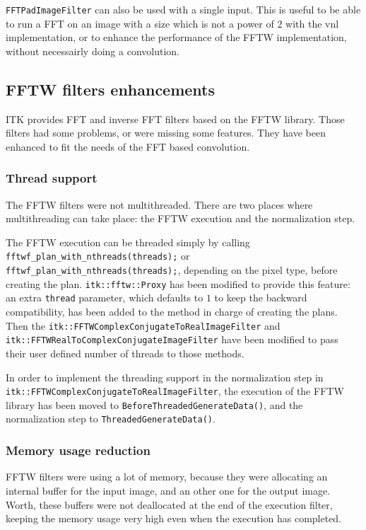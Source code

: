 \documentclass{InsightArticle}
\begin{document}
\verb$FFTPadImageFilter$ can also be used with a single input. This is useful to be able to run a FFT
on an image with a size which is not a power of 2 with the vnl implementation, or to enhance the performance
of the FFTW implementation, without necessairly doing a convolution.

\subsection{FFTW filters enhancements}

ITK provides FFT and inverse FFT filters based on the FFTW library. Those filters had some problems,
or were missing some features. They have been enhanced to fit the needs of the FFT based convolution.

\subsubsection{Thread support}
The FFTW filters were not multithreaded. There are two places where multithreading can take place: the
FFTW execution and the normalization step.

The FFTW execution can be threaded simply by calling \verb$fftwf_plan_with_nthreads(threads);$ or 
\verb$fftwf_plan_with_nthreads(threads);$, depending on the pixel type, before creating the plan. 
\verb$itk::fftw::Proxy$ has been modified to provide this feature: an extra \verb$thread$ parameter,
which defaults
to $1$ to keep the backward compatibility, has been added to the method in charge of creating the plans.
Then the \verb$itk::FFTWComplexConjugateToRealImageFilter$ and
\verb$itk::FFTWRealToComplexConjugateImageFilter$ have
been modified to pass their user defined number of threads to those methods.

In order to implement the threading support in the normalization step in 
\verb$itk::FFTWComplexConjugateToRealImageFilter$, the execution of the FFTW library has been moved to 
\verb$BeforeThreadedGenerateData()$, and the normalization step to \verb$ThreadedGenerateData()$.

\subsubsection{Memory usage reduction}

FFTW filters were using a lot of memory, because they were allocating an internal buffer for the input 
image, and an other one for the output image. Worth, these buffers were not deallocated at the end of
the execution filter, keeping the memory usage very high even when the execution has completed.
\end{document}
